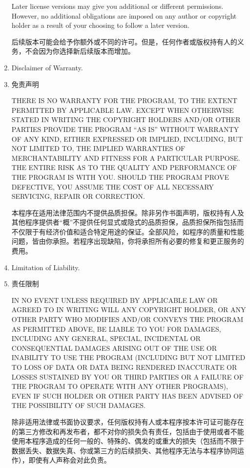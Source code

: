 \documentclass[11pt]{article}
\begin{document}
\begin{enumerate}
Later license versions may give you additional or different
permissions.  However, no additional obligations are imposed on any
author or copyright holder as a result of your choosing to follow a
later version.

后续版本可能会给予你额外或不同的许可。但是，任何作者或版权持有人的义务，不会因为你选择新后续版本而增加。

\item Disclaimer of Warranty.
\item 免责声明

\begin{sloppypar}
 THERE IS NO WARRANTY FOR THE PROGRAM, TO THE EXTENT PERMITTED BY
 APPLICABLE LAW.  EXCEPT WHEN OTHERWISE STATED IN WRITING THE
 COPYRIGHT HOLDERS AND/OR OTHER PARTIES PROVIDE THE PROGRAM ``AS IS''
 WITHOUT WARRANTY OF ANY KIND, EITHER EXPRESSED OR IMPLIED,
 INCLUDING, BUT NOT LIMITED TO, THE IMPLIED WARRANTIES OF
 MERCHANTABILITY AND FITNESS FOR A PARTICULAR PURPOSE.  THE ENTIRE
 RISK AS TO THE QUALITY AND PERFORMANCE OF THE PROGRAM IS WITH YOU.
 SHOULD THE PROGRAM PROVE DEFECTIVE, YOU ASSUME THE COST OF ALL
 NECESSARY SERVICING, REPAIR OR CORRECTION.

 本程序在适用法律范围内不提供品质担保。除非另作书面声明，版权持有人及其他程序提供者“概”不提供任何显式或隐式的品质担保，品质担保所指包括而不仅限于有经济价值和适合特定用途的保证。全部风险，如程序的质量和性能问题，皆由你承担。若程序出现缺陷，你将承担所有必要的修复和更正服务的费用。
\end{sloppypar}

\item Limitation of Liability.
\item 责任限制

 IN NO EVENT UNLESS REQUIRED BY APPLICABLE LAW OR AGREED TO IN
 WRITING WILL ANY COPYRIGHT HOLDER, OR ANY OTHER PARTY WHO MODIFIES
 AND/OR CONVEYS THE PROGRAM AS PERMITTED ABOVE, BE LIABLE TO YOU FOR
 DAMAGES, INCLUDING ANY GENERAL, SPECIAL, INCIDENTAL OR CONSEQUENTIAL
 DAMAGES ARISING OUT OF THE USE OR INABILITY TO USE THE PROGRAM
 (INCLUDING BUT NOT LIMITED TO LOSS OF DATA OR DATA BEING RENDERED
 INACCURATE OR LOSSES SUSTAINED BY YOU OR THIRD PARTIES OR A FAILURE
 OF THE PROGRAM TO OPERATE WITH ANY OTHER PROGRAMS), EVEN IF SUCH
 HOLDER OR OTHER PARTY HAS BEEN ADVISED OF THE POSSIBILITY OF SUCH
 DAMAGES.

 除非适用法律或书面协议要求，任何版权持有人或本程序按本许可证可能存在的第三方修改和再发布者，都不对你的损失负有责任，包括由于使用或者不能使用本程序造成的任何一般的、特殊的、偶发的或重大的损失（包括而不限于数据丢失、数据失真、你或第三方的后续损失、其他程序无法与本程序协同运作），即使有人声称会对此负责。


\end{enumerate}
\end{document}
